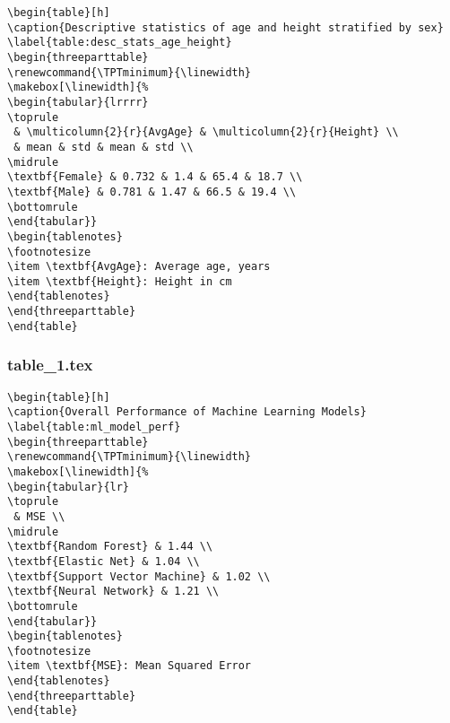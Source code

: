 \documentclass[11pt]{article}
\begin{document}
\begin{Verbatim}[tabsize=4]
\begin{table}[h]
\caption{Descriptive statistics of age and height stratified by sex}
\label{table:desc_stats_age_height}
\begin{threeparttable}
\renewcommand{\TPTminimum}{\linewidth}
\makebox[\linewidth]{%
\begin{tabular}{lrrrr}
\toprule
 & \multicolumn{2}{r}{AvgAge} & \multicolumn{2}{r}{Height} \\
 & mean & std & mean & std \\
\midrule
\textbf{Female} & 0.732 & 1.4 & 65.4 & 18.7 \\
\textbf{Male} & 0.781 & 1.47 & 66.5 & 19.4 \\
\bottomrule
\end{tabular}}
\begin{tablenotes}
\footnotesize
\item \textbf{AvgAge}: Average age, years
\item \textbf{Height}: Height in cm
\end{tablenotes}
\end{threeparttable}
\end{table}

\end{Verbatim}

\subsubsection*{table\_1.tex}

\begin{Verbatim}[tabsize=4]
\begin{table}[h]
\caption{Overall Performance of Machine Learning Models}
\label{table:ml_model_perf}
\begin{threeparttable}
\renewcommand{\TPTminimum}{\linewidth}
\makebox[\linewidth]{%
\begin{tabular}{lr}
\toprule
 & MSE \\
\midrule
\textbf{Random Forest} & 1.44 \\
\textbf{Elastic Net} & 1.04 \\
\textbf{Support Vector Machine} & 1.02 \\
\textbf{Neural Network} & 1.21 \\
\bottomrule
\end{tabular}}
\begin{tablenotes}
\footnotesize
\item \textbf{MSE}: Mean Squared Error
\end{tablenotes}
\end{threeparttable}
\end{table}

\end{Verbatim}
\end{document}
